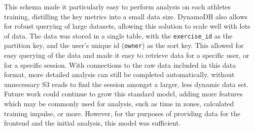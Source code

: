 This schema made it particularly easy to perform analysis on each athletes training, distilling the key metrics into a small data size. DynamoDB also allows for robust querying of large datasets, allowing this solution to scale well with lots of data. The data was stored in a single table, with the \texttt{exercise\_id} as the partition key, and the user's unique id (\texttt{owner}) as the sort key. This allowed for easy querying of the data and made it easy to retrieve data for a specific user, or for a specific session. With connections to the raw data included in this data format, more detailed analysis can still be completed automatically, without unnecessary S3 reads to find the session amongst a larger, less dynamic data set. Future work could continue to grow this standard model, adding more features which may be commonly used for analysis, such as time in zones, calculated training impulse, or more. However, for the purposes of providing data for the frontend and the initial analysis, this model was sufficient.

